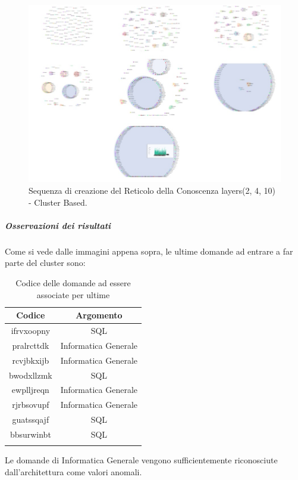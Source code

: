 \begin{figure}[H]
\centering
	\includegraphics[width=0.70\linewidth]{./image/collage_reticolo-sql(2,4,10).png}
	\caption{Sequenza di creazione del Reticolo della Conoscenza layers(2, 4, 10) - Cluster Based.}
	\label{Sequenza di creazione del Reticolo della Conoscenza layers(2, 4, 10) - Cluster Based.}
\end{figure}
\noindent
\subparagraph{Osservazioni dei risultati}\mbox{}
\noindent
Come si vede dalle immagini appena sopra, le ultime domande ad entrare a far parte del cluster sono:

\begin{longtable}{|c|c|}
	\hline
	\textbf{Codice} & \textbf{Argomento} \\\hline\hline
	ifrvxoopny & SQL \\
	pralrcttdk & Informatica Generale \\
	rcvjbkxijb & Informatica Generale \\
	bwodxllzmk & SQL \\
	ewplljreqn & Informatica Generale \\
	rjrbsovupf & Informatica Generale \\
	guatssqajf & SQL \\
	bbsurwinbt & SQL \\
\hline
	
\caption{Codice delle domande ad essere associate per ultime}\label{tab:codice delle domande ad essere associate per ultime}
\end{longtable}
\noindent
Le domande di Informatica Generale vengono sufficientemente riconosciute dall'architettura come valori anomali.

